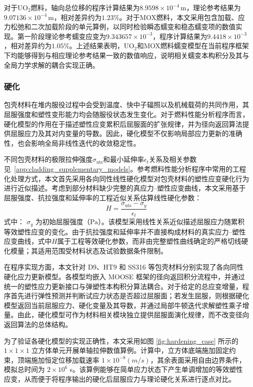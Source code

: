 对于UO$_2$燃料，轴向总位移的程序计算结果为$8.9598\times10^{-4}\,\mathrm{m}$，理论参考结果为$9.07136\times10^{-4}\,\mathrm{m}$，相对差异约为$1.23\%$。对于MOX燃料，本文采用包含加载、应力松弛和二次加载阶段的单元算例，以同时检验瞬态蠕变和稳态蠕变项的数值实现。第一阶段理论参考蠕变应变为$9.343657\times10^{-3}$，程序计算结果为$9.4418\times10^{-3}$，相对差异约为$1.05\%$。上述结果表明，UO$_2$和MOX燃料蠕变模型在当前程序框架下均能够得到与相应理论参考结果一致的数值响应，说明相关蠕变本构积分及其与全局力学求解的耦合实现正确。

\subsubsection{硬化}
包壳材料在堆内服役过程中会受到温度、快中子辐照以及机械载荷的共同作用，其屈服强度和塑性变形能力均会随服役状态发生变化。对于燃料性能分析程序而言，硬化模型的作用在于描述塑性应变累积后屈服面的扩张规律，并为径向返回算法提供屈服应力及其对内变量的导数。因此，硬化模型不仅影响局部应力更新的准确性，也会影响全局非线性迭代的收敛稳定性。

不同包壳材料的极限拉伸强度$\sigma_{\mathrm{uts}}$和最小延伸率$\epsilon_t$关系及相关参数见~\ref{app:cladding_supplementary_models}。参考燃料性能分析程序中常用的工程化处理方式，本文首先采用各向同性线性硬化模型对包壳材料的塑性应变硬化行为进行近似描述。考虑到部分材料缺少完整的真应力--塑性应变曲线，本文采用基于屈服强度、抗拉强度和延伸率的工程近似关系估算线性硬化参数：
\begin{equation}
	H = \frac{\sigma_{\mathrm{uts}}-\sigma_y}{\epsilon_t}
	\label{eq:linear_hardening_modulus}
\end{equation}
\noindent 式中： $\sigma_y$ 为初始屈服强度（$\mathrm{Pa}$）。该模型采用线性关系近似描述屈服应力随累积等效塑性应变的变化。由于抗拉强度和延伸率并不直接构成材料的真实应力--塑性应变曲线，式中$H$属于工程等效硬化参数，而非由完整塑性曲线确定的严格切线硬化模量；其适用范围受材料状态及试验数据条件限制。

在程序实现方面，本文针对 D9、HT9 和 SS316 等包壳材料分别实现了各向同性硬化应力更新模型。各模型均嵌入 MOOSE 框架的径向返回积分流程中，并通过统一的塑性应力更新接口与弹塑性本构积分算法耦合。对于给定的总应变增量，程序首先进行弹性预测并判断试应力状态是否超过屈服面；若发生屈服，则根据硬化模型返回当前屈服应力、硬化变量及其导数，并通过局部牛顿迭代求解塑性乘子增量。由此，硬化模型可作为材料相关模块独立提供屈服面演化规律，而不改变径向返回算法的总体结构。

为了验证各硬化模型的实现正确性，本文采用如图 \ref{fig:hardening_case} 所示的 $1\times1\times1$ 立方体单元开展单轴拉伸数值算例。计算中，立方体底端施加固定约束，顶端施加恒定位移加载速率 $1\times10^{-8}(m/s)$，其余表面采用自由边界条件，模拟总时间为 $2\times10^6$ s。该算例能够在简单应力状态下产生单调增加的等效塑性应变，从而便于将程序输出的硬化后屈服应力与理论硬化关系进行逐点对比。

